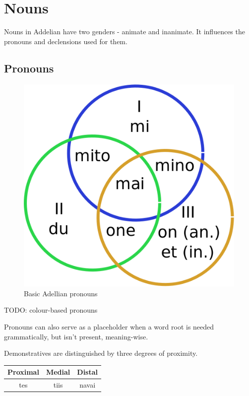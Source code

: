\documentclass[12pt]{article}
\begin{document}
	\section{Nouns}

	Nouns in Addelian have two genders - animate and inanimate. It influences the pronouns and declensions used for them.
	
	\subsection{Pronouns}
	
	\begin{figure}[h]
	\centering
	\includegraphics[scale=0.3]{pronouns}
	\caption{Basic Adellian pronouns}
	\end{figure}

	TODO: colour-based pronouns	
	
	Pronouns can also serve as a placeholder when a word root is needed grammatically, but isn't present, meaning-wise.

	Demonstratives are distinguished by three degrees of proximity.

	\begin{tabular}{|| c | c | c ||}
		\hline
		Proximal & Medial & Distal \\
		\hline
		tes & tiis &  navai \\
		\hline
	\end{tabular}
	
\end{document}
